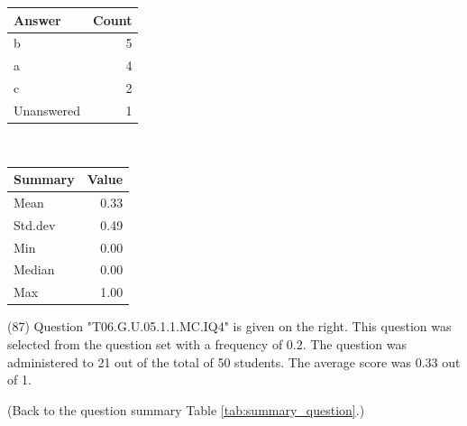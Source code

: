\documentclass[12pt,english,nohyper]{tufte-handout}\usepackage[]{graphicx}\usepackage[]{color}
\begin{document}
\begin{center}%
\begin{tabular}{lr}
  \hline
Answer & Count \\ 
  \hline
b &   5 \\ 
  a &   4 \\ 
  c &   2 \\ 
  Unanswered &   1 \\ 
   \hline
\end{tabular}
~~~~~~~~%
\begin{tabular}{lr}
  \hline
Summary & Value \\ 
  \hline
Mean & 0.33 \\ 
  Std.dev & 0.49 \\ 
  Min & 0.00 \\ 
  Median & 0.00 \\ 
  Max & 1.00 \\ 
   \hline
\end{tabular}
\end{center}\newpage{} (87) Question "T06.G.U.05.1.1.MC.IQ4" is given on the right. This question was selected from the question set with a frequency of 0.2. The question was administered to 21 out of the total of 50 students. The average score was 0.33 out of 1.

 (Back to the question summary Table \ref{tab:summary_question}.)
\end{document}
